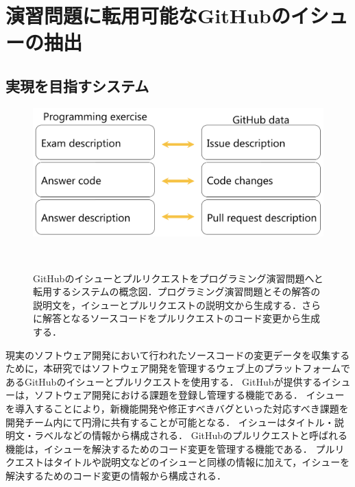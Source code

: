 \def\vector#1{\mbox{\boldmath $#1$}}

\chapter[演習問題に転用可能なGitHubのイシューの抽出]{演習問題に転用可能なGitHubのイシューの抽出}
\graphicspath{{Chapters_implementation/Figs/}}

\label{section:issue-classification}



\section{実現を目指すシステム}

\begin{figure}[tb]
    \centering
    \includegraphics[width=0.9\columnwidth]{system_diagram.png}
    \caption{GitHubのイシューとプルリクエストをプログラミング演習問題へと転用するシステムの概念図．プログラミング演習問題とその解答の説明文を，イシューとプルリクエストの説明文から生成する．さらに解答となるソースコードをプルリクエストのコード変更から生成する．}~\label{fig:system_diagram}
\end{figure}

現実のソフトウェア開発において行われたソースコードの変更データを収集するために，本研究ではソフトウェア開発を管理するウェブ上のプラットフォームであるGitHubのイシューとプルリクエストを使用する．
GitHubが提供するイシューは，ソフトウェア開発における課題を登録し管理する機能である．
イシューを導入することにより，新機能開発や修正すべきバグといった対応すべき課題を開発チーム内にて円滑に共有することが可能となる．
イシューはタイトル・説明文・ラベルなどの情報から構成される．
GitHubのプルリクエストと呼ばれる機能は，イシューを解決するためのコード変更を管理する機能である．
プルリクエストはタイトルや説明文などのイシューと同様の情報に加えて，イシューを解決するためのコード変更の情報から構成される．

